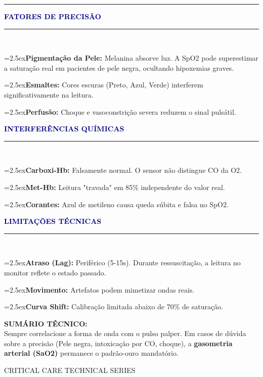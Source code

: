 \documentclass[10pt]{article}
\newcommand{\titem}[1]{\hangindent=2.5ex\raisebox{0.2ex}{\textcolor{navy}{\footnotesize$\blacktriangleright$}}\hspace{0.8ex}#1\par\vspace{0.6ex}}
\newcommand{\newsbox}[2]{
    \noindent
    \begin{minipage}{\linewidth}
        \vspace{0.4cm}
        {\headerfont\bfseries\large\textcolor{navy}{\uppercase{#1}}}\\[0.5ex]
        \drawline\\[1.5ex]
        {\small #2}
        \vspace{0.4cm}
    \end{minipage}\par
}
\newcommand{\drawline}{\noindent\textcolor{border}{\rule{\linewidth}{0.6pt}}}
\begin{document}
\begin{center}
{\begin{minipage}{\textwidth}
\vspace{0.8cm}
\drawline
\vspace{0.4cm}

\noindent
\begin{minipage}[t]{0.31\textwidth}
    \newsbox{Fatores de Precisão}{
        \titem{\textbf{Pigmentação da Pele:} Melanina absorve luz. A SpO2 pode superestimar a saturação real em pacientes de pele negra, ocultando hipoxemias graves.}
        \titem{\textbf{Esmaltes:} Cores escuras (Preto, Azul, Verde) interferem significativamente na leitura.}
        \titem{\textbf{Perfusão:} Choque e vasoconstrição severa reduzem o sinal pulsátil.}
    }
\end{minipage}\hfill
\begin{minipage}[t]{0.32\textwidth}
    \newsbox{Interferências Químicas}{
        \titem{\textbf{Carboxi-Hb:} Falsamente normal. O sensor não distingue CO da O2.}
        \titem{\textbf{Met-Hb:} Leitura "travada" em 85\% independente do valor real.}
        \titem{\textbf{Corantes:} Azul de metileno causa queda súbita e falsa no SpO2.}
    }
\end{minipage}\hfill
\begin{minipage}[t]{0.31\textwidth}
    \newsbox{Limitações Técnicas}{
        \titem{\textbf{Atraso (Lag):} Periférico (5-15s). Durante ressuscitação, a leitura no monitor reflete o estado passado.}
        \titem{\textbf{Movimento:} Artefatos podem mimetizar ondas reais.}
        \titem{\textbf{Curva Shift:} Calibração limitada abaixo de 70\% de saturação.}
    }
\end{minipage}

\vspace{1.5cm}

\begin{minipage}[t]{0.45\textwidth}
    \headerfont\textbf{SUMÁRIO TÉCNICO:}\\
    {\small Sempre correlacione a forma de onda com o pulso palper. Em casos de dúvida sobre a precisão (Pele negra, intoxicação por CO, choque), a \textbf{gasometria arterial (SaO2)} permanece o padrão-ouro mandatório.}
\end{minipage}\hfill
\begin{minipage}[t]{0.45\textwidth}
    \begin{flushright}
        \textcolor{border}{\headerfont\fontsize{30}{30}\selectfont \uppercase{Critical Care Technical Series}}
    \end{flushright}
\end{minipage}

\end{minipage}%
}
\vspace*{\fill}
\end{center}
\end{document}

